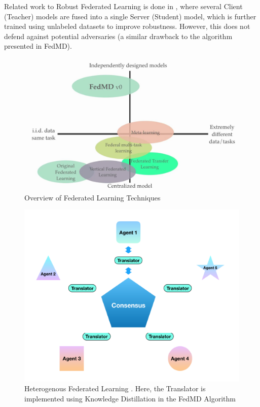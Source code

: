 \documentclass[conference]{IEEEtran}
\begin{document}
Related work to Robust Federated Learning is done in \cite{b5}, where several Client (Teacher) models are fused into a single Server (Student) model, which is further trained using unlabeled datasets to improve robustness. However, this does not defend against potential adversaries (a similar drawback to the algorithm presented in FedMD).

\begin{figure}[htbp]
\centering
\includegraphics[scale=0.2]{Status_of_Federated_Learning.jpeg}
\caption{Overview of Federated Learning Techniques}
\label{fig}
\end{figure}

\begin{figure}[htbp]
\centering
\includegraphics[scale=0.7]{Federated_Learning.png}
\caption{Heterogenous Federated Learning \cite{b4}. Here, the Translator is implemented using Knowledge Distillation in the FedMD Algorithm}
\label{fig}
\end{figure}
\end{document}

